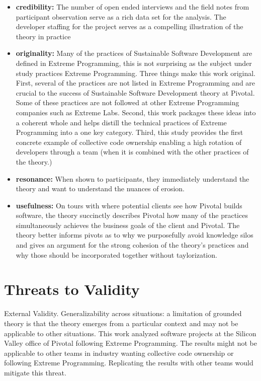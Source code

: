 \begin{itemize}
\item 
\textbf{credibility:}  The number of open ended interviews and the field notes from participant observation serve as a rich data set for the analysis. The developer staffing for the project serves as a compelling illustration of the theory in practice

\item
\textbf{originality:} Many of the practices of Sustainable Software Development are defined in Extreme Programming, this is not surprising as the subject under study practices Extreme Programming. Three things make this work original. First, several of the practices are not listed in Extreme Programming and are crucial to the success of Sustainable Software Development theory at Pivotal. Some of these practices are not followed at other Extreme Programming companies such as Extreme Labs. Second, this work packages these ideas into a coherent whole and helps distill the technical practices of Extreme Programming into a one key category. Third, this study provides the first concrete example of collective code ownership enabling a high rotation of developers through a team (when it is combined with the other practices of the theory.)

\item
\textbf{resonance:} When shown to participants, they immediately understand the theory and want to understand the nuances of erosion.

\item
\textbf{usefulness:} 
On tours with where potential clients see how Pivotal builds software, the theory succinctly describes Pivotal how many of the practices simultaneously achieves the business goals of the client and Pivotal. The theory better informs pivots as to why we purposefully avoid knowledge silos and gives an argument for the strong cohesion of the theory's practices and why those should be incorporated together without taylorization. 
\end{itemize}

\section{Threats to Validity}

External Validity. Generalizability across situations: a limitation of grounded theory is that the theory emerges from a particular context and may not be applicable to other situations. This work analyzed software projects at the Silicon Valley office of Pivotal following Extreme Programming. The results might not be applicable to other teams in industry wanting collective code ownership or  following Extreme Programming. Replicating the results with other teams would mitigate this threat.

